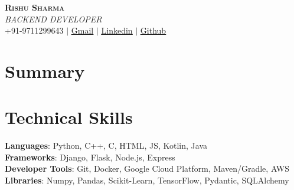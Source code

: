 \documentclass[letterpaper,11pt]{article}
\begin{document}

\begin{center}

    \textbf {\Huge \scshape Rishu Sharma} \\ \vspace{1pt}
    \small \textit{BACKEND DEVELOPER} \\
    +91-9711299643 $|$ \href{mailto:rishush804@gmail.com}{\underline{Gmail}} $|$ 
    \href{https://www.linkedin.com/in/rishusharma001/}{\underline{Linkedin}} $|$
    \href{https://github.com/Kyroyen/}{\underline{Github}}

\end{center}

\section{Summary}
 \begin{itemize}[leftmargin=0.15in, label={}]
    \small{
      
    }
 \end{itemize}

\section{Technical Skills}
 \begin{itemize}[leftmargin=0.15in, label={}]
    \small{\item{
     \textbf{Languages}{: Python, C++, C, HTML, JS, Kotlin, Java} \\
     \textbf{Frameworks}{: Django, Flask, Node.js, Express} \\
     \textbf{Developer Tools}{: Git, Docker, Google Cloud Platform, Maven/Gradle, AWS} \\
     \textbf{Libraries}{: Numpy, Pandas, Scikit-Learn, TensorFlow, Pydantic, SQLAlchemy}
    }}
 \end{itemize}


\end{document}
